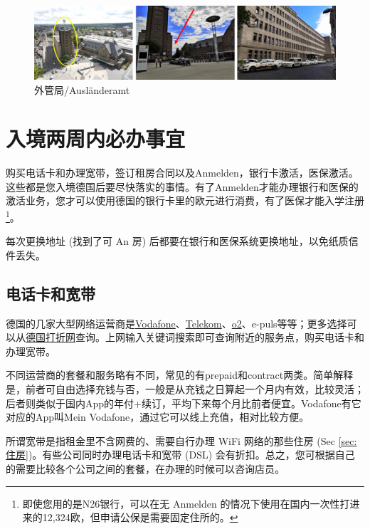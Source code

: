     \begin{figure}[ht]
      \centering
      \includegraphics[width=\textwidth]{初来乍到/Bürgerservice/外管局.png}
      \caption{外管局/Ausländeramt}
      \label{fig:外管局/Ausländeramt}
    \end{figure}

\section{入境两周内必办事宜}\label{sec:入境两周内必办事宜}

  购买电话卡和办理宽带，签订租房合同以及Anmelden，银行卡激活，医保激活。这些都是您入境德国后要尽快落实的事情。有了Anmelden才能办理银行和医保的激活业务，您才可以使用德国的银行卡里的欧元进行消费，有了医保才能入学注册\footnote{即使您用的是N26银行，可以在无 Anmelden 的情况下使用在国内一次性打进来的12,324欧，但申请公保是需要固定住所的。}。

  每次更换地址 (找到了可 An 房) 后都要在银行和医保系统更换地址，以免纸质信件丢失。

  \subsection{电话卡和宽带}\label{subsec:电话卡和宽带}

    德国的几家大型网络运营商是\href{https://www.vodafone-shops.de/aachen-203344151/}{Vodafone}、\href{https://shopseite.telekom.de/west/aachen/holzgraben-6}{Telekom}、\href{https://www.o2online.de/shops/aachen/3}{o2}、e-puls等等；更多选择可以从\href{https://www.dazhe.de/}{德国打折网}查询。上网输入关键词搜索即可查询附近的服务点，购买电话卡和办理宽带。

    不同运营商的套餐和服务略有不同，常见的有prepaid和contract两类。简单解释是，前者可自由选择充钱与否，一般是从充钱之日算起一个月内有效，比较灵活；后者则类似于国内App的年付+续订，平均下来每个月比前者便宜。Vodafone有它对应的App叫Mein Vodafone，通过它可以线上充值，相对比较方便。

    所谓宽带是指租金里不含网费的、需要自行办理 WiFi 网络的那些住房 (Sec \ref{sec:住房})。有些公司同时办理电话卡和宽带 (DSL) 会有折扣。总之，您可根据自己的需要比较各个公司之间的套餐，在办理的时候可以咨询店员。


